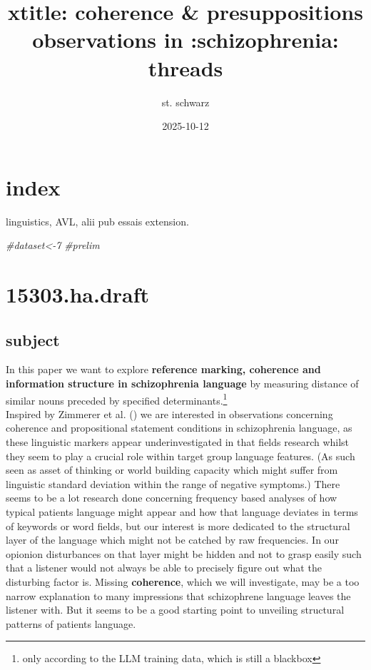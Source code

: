 \documentclass[
  12pt,
  oneside]{book}
\title{xtitle: coherence \& presuppositions observations in :schizophrenia: threads}
\author{st. schwarz}
\date{2025-10-12}
\newenvironment{Shaded}{\begin{snugshade}}{\end{snugshade}}
\newcommand{\CommentTok}[1]{\textcolor[rgb]{0.56,0.35,0.01}{\textit{#1}}}
\begin{document}
\maketitle

{
\setcounter{tocdepth}{1}
\tableofcontents
}
\chapter{index}\label{index}

linguistics, AVL, alii pub essais extension.

\begin{Shaded}
\begin{Highlighting}[]
\CommentTok{\#dataset\textless{}{-}7}
\CommentTok{\#prelim}
\end{Highlighting}
\end{Shaded}

\chapter{15303.ha.draft}\label{ha.draft}

\section{subject}\label{subject}

In this paper we want to explore \textbf{reference marking, coherence and information structure in schizophrenia language} by measuring distance of similar nouns preceded by specified determinants.\footnote{only according to the LLM training data, which is still a blackbox}\\
Inspired by Zimmerer et al. () we are interested in observations concerning coherence and propositional statement conditions in schizophrenia language, as these linguistic markers appear underinvestigated in that fields research whilst they seem to play a crucial role within target group language features. (As such seen as asset of thinking or world building capacity which might suffer from linguistic standard deviation within the range of negative symptoms.) There seems to be a lot research done concerning frequency based analyses of how typical patients language might appear and how that language deviates in terms of keywords or word fields, but our interest is more dedicated to the structural layer of the language which might not be catched by raw frequencies. In our opionion disturbances on that layer might be hidden and not to grasp easily such that a listener would not always be able to precisely figure out what the disturbing factor is. Missing \textbf{coherence}, which we will investigate, may be a too narrow explanation to many impressions that schizophrene language leaves the listener with. But it seems to be a good starting point to unveiling structural patterns of patients language.
\end{document}
